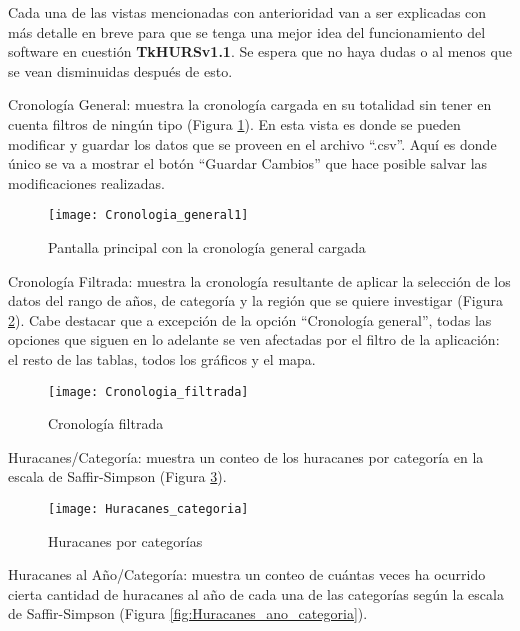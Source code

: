 Cada una de las vistas mencionadas con anterioridad van a ser explicadas con más detalle en breve para que se tenga una mejor idea del funcionamiento del software en cuestión \textbf{TkHURSv1.1}. Se espera que no haya dudas o al menos que se vean disminuidas después de esto.

\pagebreak

Cronología General: muestra la cronología cargada en su totalidad sin tener en cuenta filtros de ningún tipo (Figura \ref{fig:Cronologia_general1}). En esta vista es donde se pueden modificar y guardar los datos que se proveen en el archivo ``.csv''. Aquí es donde único se va a mostrar el botón ``Guardar Cambios'' que hace posible salvar las modificaciones realizadas.\\

\begin{figure}[H]
\centering
\texttt{[image: Cronologia\_general1]}
\caption{Pantalla principal con la cronología general cargada}
\label{fig:Cronologia_general1}
\end{figure}

\pagebreak

Cronología Filtrada: muestra la cronología resultante de aplicar la selección de los datos del rango de años, de categoría y la región que se quiere investigar (Figura \ref{fig:Cronologia_filtrada}). Cabe destacar que a excepción de la opción ``Cronología general'', todas las opciones que siguen en lo adelante se ven afectadas por el filtro de la aplicación: el resto de las tablas, todos los gráficos y el mapa.\\


\begin{figure}[H]
\centering
\texttt{[image: Cronologia\_filtrada]}
\caption{Cronología filtrada}
\label{fig:Cronologia_filtrada}
\end{figure}

Huracanes/Categoría: muestra un conteo de los huracanes por categoría en la escala de Saffir-Simpson (Figura \ref{fig:Huracanes_categoria}).

\begin{figure}[H]
\centering
\texttt{[image: Huracanes\_categoria]}
\caption{Huracanes por categorías}
\label{fig:Huracanes_categoria}
\end{figure}

\pagebreak


Huracanes al Año/Categoría: muestra un conteo de cuántas veces ha ocurrido cierta cantidad de huracanes al año de cada una de las categorías según la escala de Saffir-Simpson (Figura \ref{fig:Huracanes_ano_categoria}).

